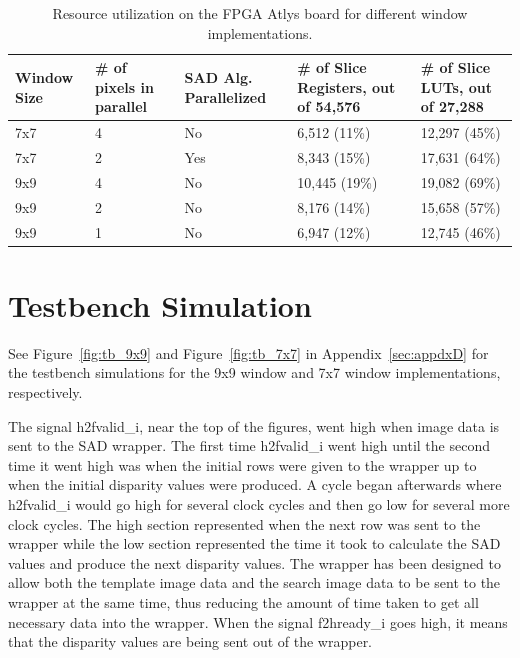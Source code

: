 \begin{table}
\begin{center}
	\begin{tabular}{| p{1.9cm} | p{2.2cm} | p{2.5cm} | p{2.9cm} | p{2.7cm} |}
		\hline
		\rowstyle{\bfseries} Window Size & 
		\rowstyle{\bfseries} \# of pixels in parallel & 
		\rowstyle{\bfseries} SAD Alg. Parallelized & 
		\rowstyle{\bfseries} \# of Slice Registers, out of 54,576 &
		\rowstyle{\bfseries} \# of Slice LUTs, out of 27,288 %
		\tabularnewline
		\hline
		7x7 & 4 & No & 6,512 (11\%) & 12,297 (45\%) %
		\tabularnewline
		\hline 
		\rowstyle{\bfseries} 7x7 & 
		\rowstyle{\bfseries} 2 & 
		\rowstyle{\bfseries} Yes & 
		\rowstyle{\bfseries} 8,343 (15\%) & 
		\rowstyle{\bfseries} 17,631 (64\%) %
		\tabularnewline
		\hline 
		\rowstyle{\bfseries} 9x9 & 
		\rowstyle{\bfseries} 4 & 
		\rowstyle{\bfseries} No & 
		\rowstyle{\bfseries} 10,445 (19\%) & 
		\rowstyle{\bfseries} 19,082 (69\%) %
		\tabularnewline
		\hline
		9x9 & 2 & No & 8,176 (14\%) & 15,658 (57\%) %
		\tabularnewline
		\hline 
		9x9 & 1 & No & 6,947 (12\%) & 12,745 (46\%) %
		\tabularnewline
		\hline 
	\end{tabular}
	\captionfonts
	\caption{Resource utilization on the FPGA Atlys board for different window implementations.}
	\label{table:utilize}
\end{center}
\end{table}

\section{Testbench Simulation}
\label{sec:testbench}

See Figure~\ref{fig:tb_9x9} and Figure~\ref{fig:tb_7x7} in Appendix~\ref{sec:appdxD} for the testbench simulations for the 9x9 window and 7x7 window implementations, respectively.

The signal h2fvalid\_i, near the top of the figures, went high when image data is sent to the SAD wrapper. The first time h2fvalid\_i went high until the second time it went high was when the initial rows were given to the wrapper up to when the initial disparity values were produced. A cycle began afterwards where h2fvalid\_i would go high for several clock cycles and then go low for several more clock cycles. The high section represented when the next row was sent to the wrapper while the low section represented the time it took to calculate the SAD values and produce the next disparity values. The wrapper has been designed to allow both the template image data and the search image data to be sent to the wrapper at the same time, thus reducing the amount of time taken to get all necessary data into the wrapper. When the signal f2hready\_i goes high, it means that the disparity values are being sent out of the wrapper.


